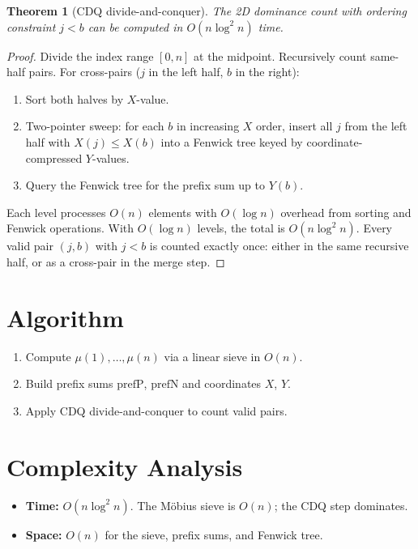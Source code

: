 \documentclass[11pt]{article}
\newtheorem{theorem}{Theorem}
\begin{document}
\begin{theorem}[CDQ divide-and-conquer]
\label{thm:cdq}
The 2D dominance count with ordering constraint $j < b$ can be computed in $O(n \log^2 n)$ time.
\end{theorem}

\begin{proof}
Divide the index range $[0, n]$ at the midpoint. Recursively count same-half pairs. For cross-pairs ($j$ in the left half, $b$ in the right):
\begin{enumerate}
    \item Sort both halves by $X$-value.
    \item Two-pointer sweep: for each $b$ in increasing $X$ order, insert all $j$ from the left half with $X(j) \le X(b)$ into a Fenwick tree keyed by coordinate-compressed $Y$-values.
    \item Query the Fenwick tree for the prefix sum up to $Y(b)$.
\end{enumerate}
Each level processes $O(n)$ elements with $O(\log n)$ overhead from sorting and Fenwick operations. With $O(\log n)$ levels, the total is $O(n \log^2 n)$. Every valid pair $(j, b)$ with $j < b$ is counted exactly once: either in the same recursive half, or as a cross-pair in the merge step.
\end{proof}

\section{Algorithm}

\begin{enumerate}
    \item Compute $\mu(1), \ldots, \mu(n)$ via a linear sieve in $O(n)$.
    \item Build prefix sums $\mathrm{prefP}$, $\mathrm{prefN}$ and coordinates $X$, $Y$.
    \item Apply CDQ divide-and-conquer to count valid pairs.
\end{enumerate}

\section{Complexity Analysis}

\begin{itemize}
    \item \textbf{Time:} $O(n \log^2 n)$. The M\"obius sieve is $O(n)$; the CDQ step dominates.
    \item \textbf{Space:} $O(n)$ for the sieve, prefix sums, and Fenwick tree.
\end{itemize}
\end{document}
